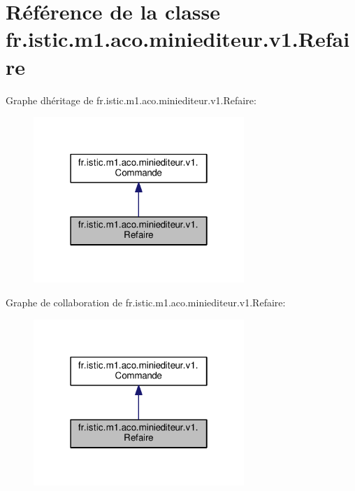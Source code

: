 \hypertarget{classfr_1_1istic_1_1m1_1_1aco_1_1miniediteur_1_1v1_1_1Refaire}{}\section{Référence de la classe fr.\+istic.\+m1.\+aco.\+miniediteur.\+v1.\+Refaire}
\label{classfr_1_1istic_1_1m1_1_1aco_1_1miniediteur_1_1v1_1_1Refaire}


Graphe d\textquotesingle{}héritage de fr.\+istic.\+m1.\+aco.\+miniediteur.\+v1.\+Refaire\+:
\nopagebreak
\begin{figure}[H]
\begin{center}
\leavevmode
\includegraphics[width=226pt]{classfr_1_1istic_1_1m1_1_1aco_1_1miniediteur_1_1v1_1_1Refaire__inherit__graph}
\end{center}
\end{figure}


Graphe de collaboration de fr.\+istic.\+m1.\+aco.\+miniediteur.\+v1.\+Refaire\+:
\nopagebreak
\begin{figure}[H]
\begin{center}
\leavevmode
\includegraphics[width=226pt]{classfr_1_1istic_1_1m1_1_1aco_1_1miniediteur_1_1v1_1_1Refaire__coll__graph}
\end{center}
\end{figure}
